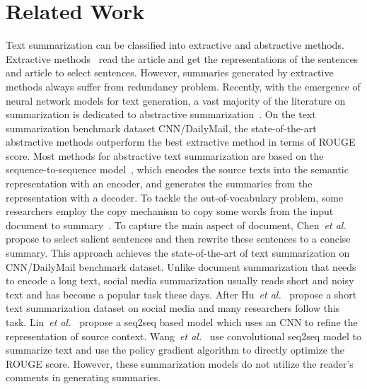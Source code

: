 \documentclass[letterpaper]{article} \usepackage{aaai19}  \usepackage{times}  \usepackage{helvet}  \usepackage{courier}
\newcommand{\etal}{\emph{et al.}\xspace}
\begin{document}
\section{Related Work}
Text summarization can be classified into extractive and abstractive methods. 
Extractive methods~\cite{Jadhav2018ExtractiveSW,Narayan2018RankingSF} read the article and get the representations of the sentences and article to select sentences.
However, summaries generated by extractive methods always suffer from redundancy problem.
Recently, with the emergence of neural network models for text generation, a vast majority of the literature on summarization is dedicated to abstractive summarization~\cite{Bansal2018FastAS,Ma2018AutoencoderAA,Zhou2018SequentialCN}.
On the text summarization benchmark dataset CNN/DailyMail, the state-of-the-art abstractive methods outperform the best extractive method in terms of ROUGE score.
Most methods for abstractive text summarization are based on the sequence-to-sequence model~\cite{Sutskever2014SequenceTS}, which encodes the source texts into the semantic representation with an encoder, and generates the summaries from the representation with a decoder.
To tackle the out-of-vocabulary problem, some researchers employ the copy mechanism to copy some words from the input document to summary~\cite{Gu2016IncorporatingCM,see2017get}.
To capture the main aspect of document, Chen~\etal~ propose to select salient sentences and then rewrite these sentences to a concise summary.
This approach achieves the state-of-the-art of text summarization on CNN/DailyMail benchmark dataset.
Unlike document summarization that needs to encode a long text, social media summarization usually reads short and noisy text and has become a popular task these days.
After Hu~\etal~ propose a short text summarization dataset on social media and many researchers follow this task.
Lin~\etal~ propose a seq2seq based model which uses an CNN to refine the representation of source context.
Wang~\etal~ use convolutional seq2seq model to summarize text and use the policy gradient algorithm to directly optimize the ROUGE score.
However, these summarization models do not utilize the reader's comments in generating summaries.
\end{document}

